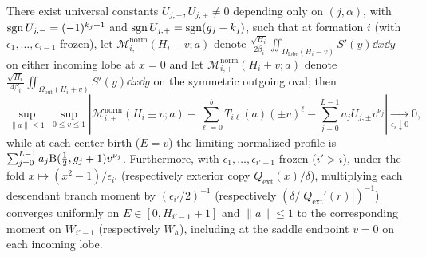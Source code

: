 \begin{lemma}\label{lem:physical-offset}
There exist universal constants $U_{j,-},U_{j,+}\ne 0$ depending only on $(j,\alpha)$, with $\operatorname{sgn} U_{j,-}=(-1)^{k_j+1}$ and $\operatorname{sgn} U_{j,+}=\operatorname{sgn}(g_j-k_j)$, such that at formation $i$ (with $\epsilon_1,\dots,\epsilon_{i-1}$ frozen), let $\mathcal{M}_{i,-}^{\mathrm{norm}}(H_i-v;a)$ denote $\frac{\sqrt{H_i}}{2\beta_i}\iint_{\Omega_{\mathrm{lobe}}(H_i-v)} S'(y)\dd x\dd y$ on either incoming lobe at $x=0$ and let $\mathcal{M}_{i,+}^{\mathrm{norm}}(H_i+v;a)$ denote $\frac{\sqrt{H_i}}{4\beta_i}\iint_{\Omega_{\mathrm{out}}(H_i+v)} S'(y)\dd x\dd y$ on the symmetric outgoing oval; then
\begin{equation}\label{eq:closed-offset-approx}
  \sup_{\|a\|\le 1}\,\sup_{0\le v\le 1}
  \left|\mathcal{M}_{i,\pm}^{\mathrm{norm}}(H_i\pm v;a) - \sum_{\ell=0}^b T_{i\ell}(a)(\pm v)^\ell - \sum_{j=0}^{L-1} a_j U_{j,\pm} v^{\nu_j}\right|
  \xrightarrow[\epsilon_i\downarrow 0]{} 0,
\end{equation}
while at each center birth ($E=v$) the limiting normalized profile is $\sum_{j=0}^{L-1}a_j\mathrm{B}(\tfrac{1}{2},g_j+1)v^{\nu_j}$. Furthermore, with $\epsilon_1,\dots,\epsilon_{i'-1}$ frozen ($i'>i$), under the fold $x\mapsto(x^2-1)/\epsilon_{i'}$ (respectively exterior copy $Q_{\mathrm{ext}}(x)/\delta$), multiplying each descendant branch moment by $(\epsilon_{i'}/2)^{-1}$ (respectively $(\delta/|Q_{\mathrm{ext}}'(r)|)^{-1}$) converges uniformly on $E\in[0,H_{i'-1}+1]$ and $\|a\|\le 1$ to the corresponding moment on $W_{i'-1}$ (respectively $W_h$), including at the saddle endpoint $v=0$ on each incoming lobe.
\end{lemma}

